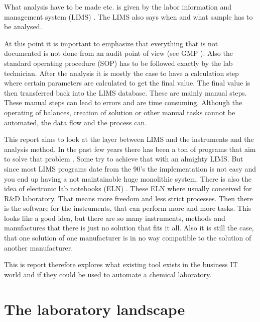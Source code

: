 \documentclass[paper=a4,twoside=false,BCOR=0mm,DIV=calc,fontsize=12pt]{scrartcl}
\begin{document}
What analysis have to be made etc. is given by the labor information and management system (LIMS) \cite{lims}. The LIMS also says when and what sample has to be analysed.

At this point it is important to emphasize that everything that is not documented is not done from an audit point of view (see GMP \cite{gmp}). Also the standard operating procedure (SOP) has to be followed exactly by the lab technician.
After the analysis it is mostly the case to have a calculation step where certain parameters are calculated to get the final value. The final value is then transferred back into the LIMS database. These are mainly manual steps. These manual steps can lead to errors and are time consuming.
Although the operating of balances, creation of solution or other manual tasks cannot be automated, the data flow and the process can.

This report aims to look at the layer between LIMS and the instruments and the analysis method. In the past few years there has been a ton of programs that aim to solve that problem \cite{}.  Some try to achieve that with an almighty LIMS. But since most LIMS programs date from the 90's the implementation is not easy and you end up having a not maintainable huge monolithic system. There is also the idea of electronic lab notebooks (ELN) \cite{eln}. These ELN where usually conceived for R\&D laboratory. That means more freedom and less strict processes.
Then there is the software for the instruments, that can perform more and more tasks. This looks like a good idea, but there are so many instruments, methods and manufactures that there is just no solution that fits it all. Also it is still the case, that one solution of one manufacturer is in no way compatible to the solution of another manufacturer.

This is report therefore explores what existing tool exists in the business IT world and if they could be used to automate a chemical laboratory.


\section{The laboratory landscape}
\end{document}
